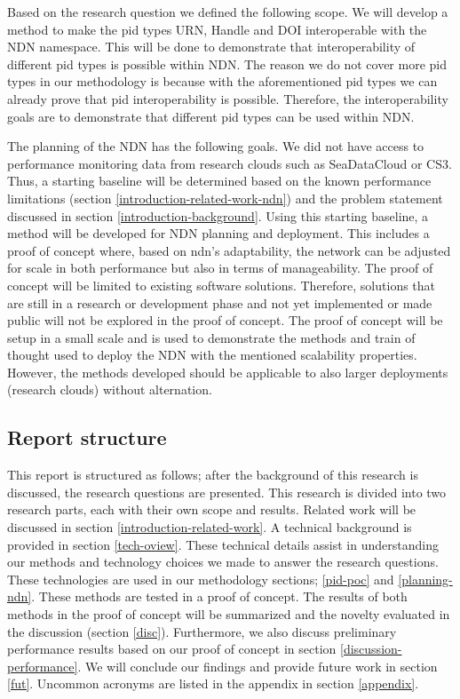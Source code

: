 
Based on the research question we defined the following scope. We will develop a method to make the \gls{pid} types URN, Handle and DOI interoperable with the NDN namespace. This will be done to demonstrate that interoperability of different \gls{pid} types is possible within NDN. The reason we do not cover more \gls{pid} types in our methodology is because with the aforementioned \gls{pid} types we can already prove that \gls{pid} interoperability is possible. Therefore, the interoperability goals are to demonstrate that different \gls{pid} types can be used within NDN.

The planning of the NDN has the following goals. We did not have access to performance monitoring data from research clouds such as SeaDataCloud or CS3. Thus, a starting baseline will be determined based on the known performance limitations (section \ref{introduction-related-work-ndn}) and the problem statement discussed in section \ref{introduction-background}. Using this starting baseline, a method will be developed for NDN planning and deployment. This includes a proof of concept where, based on \gls{ndn}'s adaptability, the network can be adjusted for scale in both performance but also in terms of manageability. The proof of concept will be limited to existing software solutions. Therefore, solutions that are still in a research or development phase and not yet implemented or made public will not be explored in the proof of concept. The proof of concept will be setup in a small scale and is used to demonstrate the methods and train of thought used to deploy the NDN with the mentioned scalability properties. However, the methods developed should be applicable to also larger deployments (research clouds) without alternation.

\subsection{Report structure}
This report is structured as follows; after the background of this research is discussed, the research questions are presented. This research is divided into two research parts, each with their own scope and results. Related work will be discussed in section \ref{introduction-related-work}. A technical background is provided in section \ref{tech-oview}. These technical details assist in understanding our methods and technology choices we made to answer the research questions. These technologies are used in our methodology sections; \ref{pid-poc} and \ref{planning-ndn}. These methods are tested in a proof of concept. The results of both methods in the proof of concept will be summarized and the novelty evaluated in the discussion (section \ref{disc}). Furthermore, we also discuss preliminary performance results based on our proof of concept in section \ref{discussion-performance}. We will conclude our findings and provide future work in section \ref{fut}. Uncommon acronyms are listed in the appendix in section \ref{appendix}.



